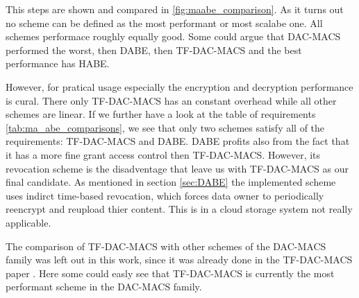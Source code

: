 This steps are shown and compared in \ref{fig:maabe_comparison}. As it turns out no scheme can be defined as the most performant or most scalabe one. All schemes performace roughly equally good. Some could argue that \ac{DAC-MACS} performed the worst, then \ac{DABE}, then \ac{TF-DAC-MACS} and the best performance has \ac{HABE}. 

However, for pratical usage especially the encryption and decryption performance is cural. There only \ac{TF-DAC-MACS} has an constant overhead while all other schemes are linear. If we further have a look at the table of requirements \ref{tab:ma_abe_comparisons}, we see that only two schemes satisfy all of the requirements: \ac{TF-DAC-MACS} and \ac{DABE}. \ac{DABE} profits also from the fact that it has a more fine grant access control then \ac{TF-DAC-MACS}. However, its revocation scheme is the disadventage that leave us with \ac{TF-DAC-MACS} as our final candidate. As mentioned in section \ref{sec:DABE} the implemented scheme uses indirct time-based revocation, which forces data owner to periodically reencrypt and reupload thier content. This is in a cloud storage system not really applicable. 

The comparison of \ac{TF-DAC-MACS} with other schemes of the \ac{DAC-MACS} family was left out in this work, since it was already done in the \ac{TF-DAC-MACS} paper \cite{li2017two}. Here some could easly see that \ac{TF-DAC-MACS} is currently the most performant scheme in the \ac{DAC-MACS} family.  